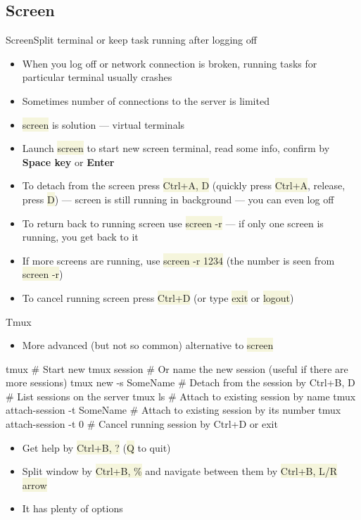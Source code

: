\documentclass[compress, ucs, xelatex, 11pt, xcolor=svgnames, aspectratio=169,
	hyperref={
		bookmarks=true,
		unicode=true,
		colorlinks=true,
		pdftitle={Linux, command line and MetaCentrum},
		plainpages=false,
		pdfauthor={Vojtech Zeisek},
		pdfsubject={Course about use of Linux command line, writing shell scripts and using MetaCentrum of CESNET},
		pdfcreator={XeLaTeX},
		pdfkeywords={Linux, GNU, BASH, shell, command line, MetaCentrum},
		linkcolor=DarkRed, %
		anchorcolor=DarkBlue, %
		citecolor=Indigo, %
		filecolor=NavyBlue, %
		menucolor=DarkMagenta, %
		urlcolor=DarkBlue, %
		pdftex},
	url={hyphens, lowtilde} %
	]{beamer}
\renewcommand{\texttt}[1]{\colorbox{Beige}{{\ttfamily #1}}}
\begin{document}
\subsection{Screen}

\begin{frame}{Screen}{Split terminal or keep task running after logging off}
	\begin{itemize}
		\item When you log off or network connection is broken, running tasks for particular terminal usually crashes
		\item Sometimes number of connections to the server is limited
		\item \texttt{screen} is solution --- virtual terminals
		\item Launch \texttt{screen} to start new screen terminal, read some info, confirm by \textbf{Space key} or \textbf{Enter}
		\item To detach from the screen press \texttt{Ctrl+A, D} (quickly press \texttt{Ctrl+A}, release, press \texttt{D}) --- screen is still running in background --- you can even log off
		\item To return back to running screen use \texttt{screen -r} --- if only one screen is running, you get back to it
		\item If more screens are running, use \texttt{screen -r 1234} (the number is seen from \texttt{screen -r})
		\item To cancel running screen press \texttt{Ctrl+D} (or type \texttt{exit} or \texttt{logout})
	\end{itemize}
\end{frame}

\begin{frame}[fragile]{Tmux}
	\begin{itemize}
		\item More advanced (but not so common) alternative to \texttt{screen}
	\end{itemize}
	\vfill
	\begin{bashcode}
    tmux # Start new tmux session
    # Or name the new session (useful if there are more sessions)
    tmux new -s SomeName
    # Detach from the session by Ctrl+B, D
    # List sessions on the server
    tmux ls
    # Attach to existing session by name
    tmux attach-session -t SomeName
    # Attach to existing session by its number
    tmux attach-session -t 0
    # Cancel running session by Ctrl+D or exit
	\end{bashcode}
	\vfill
	\begin{itemize}
		\item Get help by \texttt{Ctrl+B, ?} (\texttt{Q} to quit)
		\item Split window by \texttt{Ctrl+B, \%} and navigate between them by \texttt{Ctrl+B, L/R arrow}
		\item It has plenty of options
	\end{itemize}
\end{frame}
\end{document}
